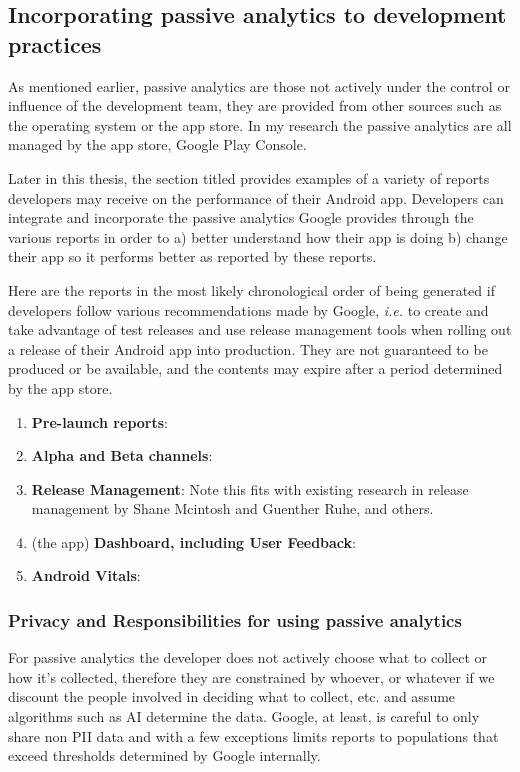 

\subsection{Incorporating passive analytics to development practices}
As mentioned earlier, passive analytics are those not actively under the control or influence of the development team, they are provided from other sources such as the operating system or the app store. In my research the passive analytics are all managed by the app store, Google Play Console.

Later in this thesis, the section titled \href{google_play_console_section}{\emph{}} provides examples of a variety of reports developers may receive on the performance of their Android app. Developers can integrate and incorporate the passive analytics Google provides through the various reports in order to a) better understand how their app is doing b) change their app so it performs better as reported by these reports.

Here are the reports in the most likely chronological order of being generated if developers follow various recommendations made by Google, \emph{i.e.} to create and take advantage of test releases and use release management tools when rolling out a release of their Android app into production. They are not guaranteed to be produced or be available, and the contents may expire after a period determined by the app store.

\begin{enumerate}
    \item \textbf{Pre-launch reports}: 
    \item \textbf{Alpha and Beta channels}:
    \item \textbf{Release Management}: Note this fits with existing research in release management by Shane Mcintosh and Guenther Ruhe, and others.
    
    \item (the app) \textbf{Dashboard, including User Feedback}:
    \item \textbf{Android Vitals}:
\end{enumerate}

\subsubsection{Privacy and Responsibilities for using passive analytics}
For passive analytics the developer does not actively choose what to collect or how it's collected, therefore they are constrained by whoever, or whatever if we discount the people involved in deciding what to collect, etc. and assume algorithms such as AI determine the data. Google, at least, is careful to only share non PII %
data and with a few exceptions limits reports to populations that exceed thresholds determined by Google internally. %

